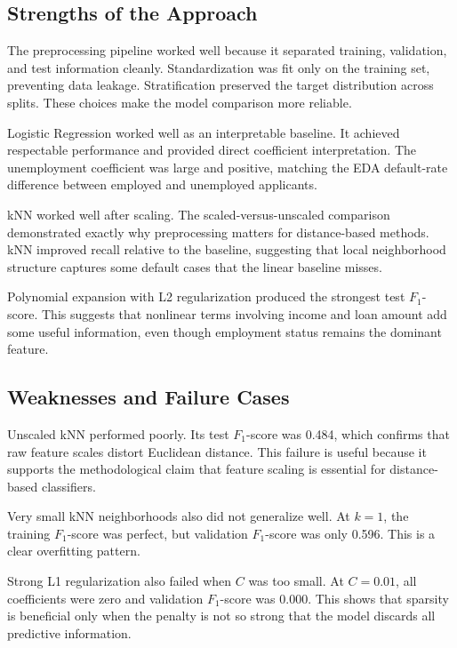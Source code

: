 \documentclass[12pt]{article}
\begin{document}
\subsection{Strengths of the Approach}

The preprocessing pipeline worked well because it separated training, validation, and test information cleanly. Standardization was fit only on the training set, preventing data leakage. Stratification preserved the target distribution across splits. These choices make the model comparison more reliable.

Logistic Regression worked well as an interpretable baseline. It achieved respectable performance and provided direct coefficient interpretation. The unemployment coefficient was large and positive, matching the EDA default-rate difference between employed and unemployed applicants.

kNN worked well after scaling. The scaled-versus-unscaled comparison demonstrated exactly why preprocessing matters for distance-based methods. kNN improved recall relative to the baseline, suggesting that local neighborhood structure captures some default cases that the linear baseline misses.

Polynomial expansion with L2 regularization produced the strongest test $F_1$-score. This suggests that nonlinear terms involving income and loan amount add some useful information, even though employment status remains the dominant feature.

\subsection{Weaknesses and Failure Cases}

Unscaled kNN performed poorly. Its test $F_1$-score was 0.484, which confirms that raw feature scales distort Euclidean distance. This failure is useful because it supports the methodological claim that feature scaling is essential for distance-based classifiers.

Very small kNN neighborhoods also did not generalize well. At $k=1$, the training $F_1$-score was perfect, but validation $F_1$-score was only 0.596. This is a clear overfitting pattern.

Strong L1 regularization also failed when $C$ was too small. At $C=0.01$, all coefficients were zero and validation $F_1$-score was 0.000. This shows that sparsity is beneficial only when the penalty is not so strong that the model discards all predictive information.
\end{document}
